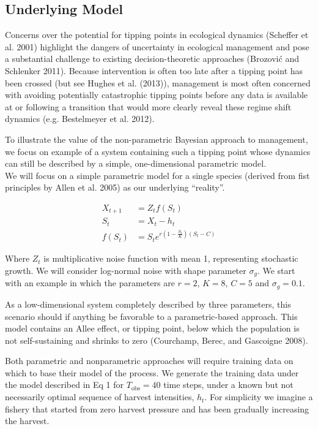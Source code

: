 \documentclass[author-year, review]{elsarticle} %
\begin{document}
\subsection{Underlying Model}

Concerns over the potential for tipping points in ecological dynamics
(Scheffer et al. 2001) highlight the dangers of uncertainty in
ecological management and pose a substantial challenge to existing
decision-theoretic approaches (Brozović and Schlenker 2011). Because
intervention is often too late after a tipping point has been crossed
(but see Hughes et al. (2013)), management is most often concerned with
avoiding potentially catastrophic tipping points before any data is
available at or following a transition that would more clearly reveal
these regime shift dynamics (e.g. Bestelmeyer et al. 2012).

To illustrate the value of the non-parametric Bayesian approach to
management, we focus on example of a system containing such a tipping
point whose dynamics can still be described by a simple, one-dimensional
parametric model.\\We will focus on a simple parametric model for a
single species (derived from fist principles by Allen et al. 2005) as
our underlying ``reality''.

\begin{align}
X_{t+1} &= Z_t f(S_t) \\
S_t &= X_t - h_t \\
f(S_t) &= S_t e^{r \left(1 - \frac{S_t}{K}\right)\left(S_t - C\right)}
\end{align}

Where $Z_t$ is multiplicative noise function with mean 1, representing
stochastic growth. We will consider log-normal noise with shape
parameter $\sigma_g$. We start with an example in which the parameters
are $r =2$, $K=8$, $C=5$ and $\sigma_g = 0.1$.

As a low-dimensional system completely described by three parameters,
this scenario should if anything be favorable to a parametric-based
approach. This model contains an Allee effect, or tipping point, below
which the population is not self-sustaining and shrinks to zero
(Courchamp, Berec, and Gascoigne 2008).

Both parametric and nonparametric approaches will require training data
on which to base their model of the process. We generate the training
data under the model described in Eq 1 for $T_{\textrm{obs}}=40$ time
steps, under a known but not necessarily optimal sequence of harvest
intensities, $h_t$. For simplicity we imagine a fishery that started
from zero harvest pressure and has been gradually increasing the
harvest.
\end{document}
